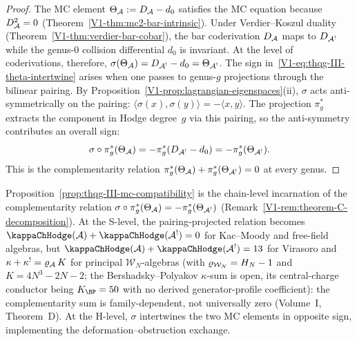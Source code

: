 \begin{proof}
The MC element $\Theta_{\mathcal{A}} := D_{\mathcal{A}} - d_0$ satisfies the MC
equation because $D_{\mathcal{A}}^2 = 0$
(Theorem~\ref*{V1-thm:mc2-bar-intrinsic}).
Under Verdier--Koszul duality
(Theorem~\ref*{V1-thm:verdier-bar-cobar}), the bar
coderivation $D_{\mathcal{A}}$ maps to $D_{\mathcal{A}^!}$ while the genus-$0$
collision differential $d_0$ is invariant. At the level of
coderivations, therefore,
$\sigma(\Theta_{\mathcal{A}}) = D_{\mathcal{A}^!} - d_0 = \Theta_{\mathcal{A}^!}$.
The sign in~\eqref{V1-eq:thqg-III-theta-intertwine} arises when
one passes to genus-$g$ projections through the bilinear
pairing. By
Proposition~\ref{V1-prop:lagrangian-eigenspaces}(ii), $\sigma$
acts anti-symmetrically on the pairing:
$\langle \sigma(x), \sigma(y) \rangle
= -\langle x, y \rangle$.
The projection $\pi_g^*$ extracts the component in Hodge
degree~$g$ via this pairing, so the anti-symmetry contributes
an overall sign:
\[
\sigma \circ \pi_g^*(\Theta_{\mathcal{A}})
= -\pi_g^*(D_{\mathcal{A}^!} - d_0)
= -\pi_g^*(\Theta_{\mathcal{A}^!}).
\]
This is the complementarity relation
$\pi_g^*(\Theta_{\mathcal{A}}) + \pi_g^*(\Theta_{\mathcal{A}^!}) = 0$
at every genus.
\end{proof}

\begin{remark}
Proposition~\ref{prop:thqg-III-mc-compatibility} is the
chain-level incarnation of the complementarity relation
$\sigma \circ \pi_g^*(\Theta_{\mathcal{A}}) = -\pi_g^*(\Theta_{\mathcal{A}^!})$
(Remark~\ref{V1-rem:theorem-C-decomposition}).
At the S-level, the pairing-projected relation becomes
$\kappaChHodge(\cA) + \kappaChHodge(\cA^!) = 0$ for Kac--Moody and free-field algebras,
but $\kappaChHodge(\cA) + \kappaChHodge(\cA^!) = 13$ for Virasoro and
$\kappa + \kappa^! = \varrho_{\mathcal{A}}\,K$ for principal
$\mathcal{W}_N$-algebras
(with $\varrho_{\mathcal{W}_N} = H_N - 1$ and $K = 4N^3 - 2N - 2$; the
Bershadsky--Polyakov $\kappa$-sum is open, its central-charge
conductor being $K_{\BP} = 50$ with no derived
generator-profile coefficient):
the complementarity sum is family-dependent, not universally
zero (Volume~I, Theorem~D).
At the H-level, $\sigma$ intertwines the two MC elements in
opposite sign, implementing the deformation--obstruction
exchange.
\end{remark}

